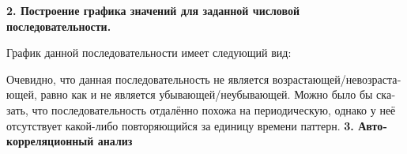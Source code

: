 \documentclass[a4paper]{article}
\author{Инкогнито Грешитель}
\date{2024-10-04}
\begin{document}
\clearpage
\pagestyle{Standard}

\foreignlanguage{russian}{\textbf{2. Построение графика значений для заданной числовой последовательности.}}

\foreignlanguage{russian}{График данной последовательности имеет следующий вид:}


\foreignlanguage{russian}{Очевидно, что данная последовательность не является возрастающей/невозрастающей, равно как и
не является убывающей/неубывающей. Можно было бы сказать, что последовательность отдалённо похожа на периодическую,
однако у неё отсутствует какой-либо повторяющийся за единицу времени паттерн.}\newline
\newline
\foreignlanguage{russian}{\textbf{3. Автокорреляционный анализ}}
\end{document}
